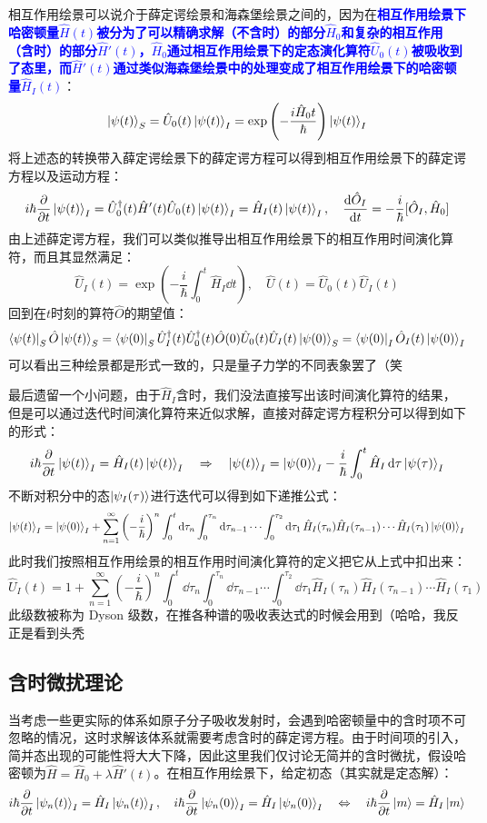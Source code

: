 相互作用绘景可以说介于薛定谔绘景和海森堡绘景之间的，因为在\textcolor{blue}{\textbf{相互作用绘景下哈密顿量$\hat{H}(t)$被分为了可以精确求解（不含时）的部分$\hat{H}_0$和复杂的相互作用（含时）的部分$\hat{H}'(t)$，$\hat{H}_0$通过相互作用绘景下的定态演化算符$\hat{U}_0(t)$被吸收到了态里，而$\hat{H}'(t)$通过类似海森堡绘景中的处理变成了相互作用绘景下的哈密顿量$\hat{H}_I(t)$}}：
\[\ket{\psi(t)}_S=\hat{U}_0(t)\ket{\psi(t)}_I=\exp\left(-\frac{i\hat{H}_0t}{\hbar}\right)\ket{\psi(t)}_I\]
将上述态的转换带入薛定谔绘景下的薛定谔方程可以得到相互作用绘景下的薛定谔方程以及运动方程：
\[i\hbar\pdv{t}\ket{\psi(t)}_I=\hat{U}^{\dagger}_0(t)\hat{H}'(t)\hat{U}_0(t)\ket{\psi(t)}_I=\hat{H}_I(t)\ket{\psi(t)}_I, \quad \dv{\hat{O}_I}{t}=-\frac{i}{\hbar}[\hat{O}_I,\hat{H}_0]\]
由上述薛定谔方程，我们可以类似推导出相互作用绘景下的相互作用时间演化算符，而且其显然满足：
\[\hat{U}_I(t)=\exp\left(-\frac{i}{\hbar}\int_{0}^{t}\hat{H}_I\dd{t}\right), \quad \hat{U}(t)=\hat{U}_0(t)\hat{U}_I(t)\]
回到在$t$时刻的算符$\hat{O}$的期望值：
\[\bra{\psi(t)}_S\hat{O}\ket{\psi(t)}_S=\bra{\psi(0)}_S\hat{U}_I^{\dagger}(t)\hat{U}_0^{\dagger}(t)\hat{O}(0)\hat{U}_0(t)\hat{U}_I(t)\ket{\psi(0)}_S=\bra{\psi(0)}_I\hat{O}_I(t)\ket{\psi(0)}_I\]
可以看出三种绘景都是形式一致的，只是量子力学的不同表象罢了（笑

最后遗留一个小问题，由于$\hat{H}_I$含时，我们没法直接写出该时间演化算符的结果，但是可以通过迭代时间演化算符来近似求解，直接对薛定谔方程积分可以得到如下的形式：
\[i\hbar\pdv{t}\ket{\psi(t)}_I=\hat{H}_I(t)\ket{\psi(t)}_I \quad \Rightarrow \quad \ket{\psi(t)}_I=\ket{\psi(0)}_I-\frac{i}{\hbar}\int_{0}^{t}\hat{H}_I\dd{\tau}\ket{\psi(\tau)}_I\]
不断对积分中的态$\ket{\psi_I(\tau)}$进行迭代可以得到如下递推公式：
\[\ket{\psi(t)}_I=\ket{\psi(0)}_I+\sum_{n=1}^{\infty}\left(-\frac{i}{\hbar}\right)^n\int_{0}^t\dd{\tau_n}\int_{0}^{\tau_n}\dd{\tau_{n-1}}\cdots\int_{0}^{\tau_2}\dd{\tau_1}\hat{H}_I(\tau_n)\hat{H}_I(\tau_{n-1})\cdots\hat{H}_I(\tau_1)\ket{\psi(0)}_I\]
此时我们按照相互作用绘景的相互作用时间演化算符的定义把它从上式中扣出来：
\[\hat{U}_I(t)=1+\sum_{n=1}^{\infty}\left(-\frac{i}{\hbar}\right)^n\int_{0}^t\dd{\tau_n}\int_{0}^{\tau_n}\dd{\tau_{n-1}}\cdots\int_{0}^{\tau_2}\dd{\tau_1}\hat{H}_I(\tau_n)\hat{H}_I(\tau_{n-1})\cdots\hat{H}_I(\tau_1)\]
此级数被称为 Dyson 级数，在推各种谱的吸收表达式的时候会用到（哈哈，我反正是看到头秃

\newpage
\subsection{含时微扰理论}\label{sec:tdpt}
当考虑一些更实际的体系如原子分子吸收发射时，会遇到哈密顿量中的含时项不可忽略的情况，这时求解该体系就需要考虑含时的薛定谔方程。由于时间项的引入，简并态出现的可能性将大大下降，因此这里我们仅讨论无简并的含时微扰，假设哈密顿为$\hat{H}=\hat{H}_0+\lambda\hat{H}'(t)$。在相互作用绘景下，给定初态（其实就是定态解）：
\[i\hbar\pdv{t}\ket{\psi_n(t)}_I=\hat{H}_I\ket{\psi_n(t)}_I, \quad i\hbar\pdv{t}\ket{\psi_n(0)}_I=\hat{H}_I\ket{\psi_n(0)}_I \quad \Leftrightarrow \quad i\hbar\pdv{t}\ket{m}=\hat{H}_I\ket{m}\]

